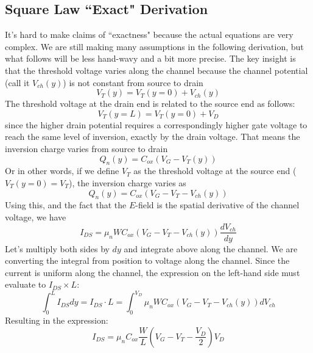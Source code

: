 \subsection{Square Law ``Exact" Derivation}
It's hard to make claims of ``exactness" because the actual equations are very complex.  We are still making many assumptions in the following derivation, but what follows will be less hand-wavy and a bit more precise.  The key insight is that the threshold voltage varies along the channel because the channel potential (call it $V_{ch}(y)$) is not constant from source to drain
    \begin{equation} 
        V_T(y) = V_T(y= 0 ) + V_{ch}(y) 
    \end{equation}
The threshold voltage at the drain end is related to the source end as follows:
    \begin{equation} 
        V_T(y=L) = V_T(y = 0) + V_D 
    \end{equation} 
since the higher drain potential requires a correspondingly higher gate voltage to reach the same level of inversion, exactly by the drain voltage.  That means the inversion charge varies from source to drain
    \begin{equation} 
        Q_n(y) = C_{ox} (V_G - V_T(y)) 
    \end{equation}
Or in other words, if we define $V_T$ as the threshold voltage at the source end ($V_T(y=0) = V_{T}$), the inversion charge varies as
    \begin{equation} 
        Q_n(y) = C_{ox} (V_G - V_T - V_{ch}(y) )  \label{eq:invcharge}
    \end{equation}
Using this, and the fact that the $E$-field is the spatial derivative of the channel voltage, we have
    \begin{equation} 
        I_{DS} = \mu_n W C_{ox} \left(V_G - V_T - V_{ch}(y) \right) \frac{dV_{ch}}{dy} 
    \end{equation}
Let's multiply both sides by $dy$ and integrate above along the channel.  We are converting the integral from position to voltage along the channel.  Since the current is uniform along the channel, the expression on the left-hand side must evaluate to $I_{DS} \times L$:
    \begin{equation} 
        \int_0^L I_{DS} dy = I_{DS} \cdot L = \int_0^{V_D} \mu_n W C_{ox} (V_G - V_T - V_{ch}(y)) dV_{ch} 
    \end{equation}
Resulting in the expression:
    \begin{equation} 
        I_{DS} = \mu_n C_{ox} \frac{W}{L} \left( V_G - V_T - \frac{V_D}{2} \right) V_D
        \label{eq:ids_triode}
    \end{equation}
